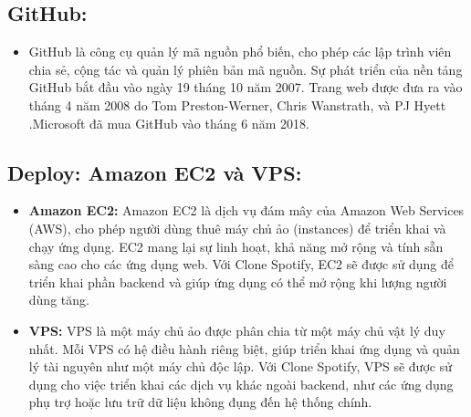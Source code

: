 \subsection{GitHub:}
\begin{itemize}
    \item GitHub là công cụ quản lý mã nguồn phổ biến, cho phép các lập trình viên chia sẻ, cộng tác và quản lý phiên bản mã nguồn. Sự phát triển của nền tảng GitHub bắt đầu vào ngày 19 tháng 10 năm 2007. Trang web được đưa ra vào tháng 4 năm 2008 do Tom Preston-Werner, Chris Wanstrath, và PJ Hyett .Microsoft đã mua GitHub vào tháng 6 năm 2018.
\end{itemize}

\subsection{ Deploy: Amazon EC2 và VPS:}
\begin{itemize}
    \item \textbf{Amazon EC2:} Amazon EC2 là dịch vụ đám mây của Amazon Web Services (AWS), cho phép người dùng thuê máy chủ ảo (instances) để triển khai và chạy ứng dụng. EC2 mang lại sự linh hoạt, khả năng mở rộng và tính sẵn sàng cao cho các ứng dụng web. Với Clone Spotify, EC2 sẽ được sử dụng để triển khai phần backend và giúp ứng dụng có thể mở rộng khi lượng người dùng tăng.
    \item \textbf{VPS:} VPS là một máy chủ ảo được phân chia từ một máy chủ vật lý duy nhất. Mỗi VPS có hệ điều hành riêng biệt, giúp triển khai ứng dụng và quản lý tài nguyên như một máy chủ độc lập. Với Clone Spotify, VPS sẽ được sử dụng cho việc triển khai các dịch vụ khác ngoài backend, như các ứng dụng phụ trợ hoặc lưu trữ dữ liệu không đụng đến hệ thống chính.
\end{itemize}